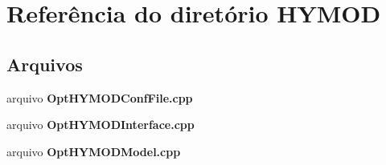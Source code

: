 \section{Referência do diretório H\+Y\+M\+OD}
\label{dir_070cd75aab5ee1ef286f6d034f8381b1}
\subsection*{Arquivos}
\begin{DoxyCompactItemize}
\item 
arquivo {\bf Opt\+H\+Y\+M\+O\+D\+Conf\+File.\+cpp}
\item 
arquivo {\bf Opt\+H\+Y\+M\+O\+D\+Interface.\+cpp}
\item 
arquivo {\bf Opt\+H\+Y\+M\+O\+D\+Model.\+cpp}
\end{DoxyCompactItemize}
